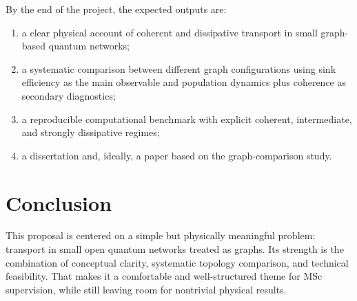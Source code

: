 \documentclass[11pt,a4paper]{article}
\begin{document}
By the end of the project, the expected outputs are:
\begin{enumerate}
  \item a clear physical account of coherent and dissipative transport in small
  graph-based quantum networks;
  \item a systematic comparison between different graph configurations using
  sink efficiency as the main observable and population dynamics plus coherence
  as secondary diagnostics;
  \item a reproducible computational benchmark with explicit coherent,
  intermediate, and strongly dissipative regimes;
  \item a dissertation and, ideally, a paper based on the graph-comparison
  study.
\end{enumerate}

\section{Conclusion}

This proposal is centered on a simple but physically meaningful problem:
transport in small open quantum networks treated as graphs. Its strength is the
combination of conceptual clarity, systematic topology comparison, and technical
feasibility. That makes it a comfortable and well-structured theme for MSc
supervision, while still leaving room for nontrivial physical results.



\end{document}
